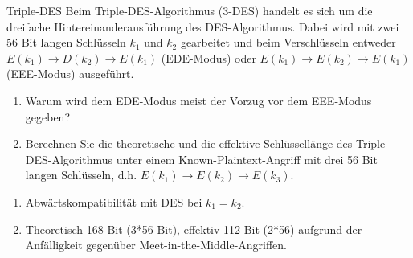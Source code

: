 \documentclass{article}
\begin{document}
\begin{exercise}{Triple-DES}
  Beim Triple-DES-Algorithmus (3-DES) handelt es sich um die dreifache Hintereinanderausführung des DES-Algorithmus. Dabei wird mit zwei 56 Bit langen Schlüsseln $k_1$ und $k_2$ gearbeitet und beim Verschlüsseln entweder $E(k_1) \to D(k_2) \to E(k_1)$ (EDE-Modus) oder $E(k_1) \to E(k_2) \to E(k_1)$ (EEE-Modus) ausgeführt.
  \begin{enumerate}
    \item Warum wird dem EDE-Modus meist der Vorzug vor dem EEE-Modus gegeben?
    \item Berechnen Sie die theoretische und die effektive Schlüssellänge des Triple-DES-Algorithmus unter einem Known-Plaintext-Angriff mit drei 56 Bit langen Schlüsseln, d.h. $E(k_1) \to E(k_2) \to E(k_3)$.
  \end{enumerate}

  \begin{solution}
    \begin{enumerate}
        \item Abwärtskompatibilität mit DES bei $k_1=k_2$.
        \item Theoretisch 168 Bit (3*56 Bit), effektiv 112 Bit (2*56) aufgrund der Anfälligkeit gegenüber Meet-in-the-Middle-Angriffen.
    \end{enumerate}
  \end{solution}
\end{exercise}
\end{document}

